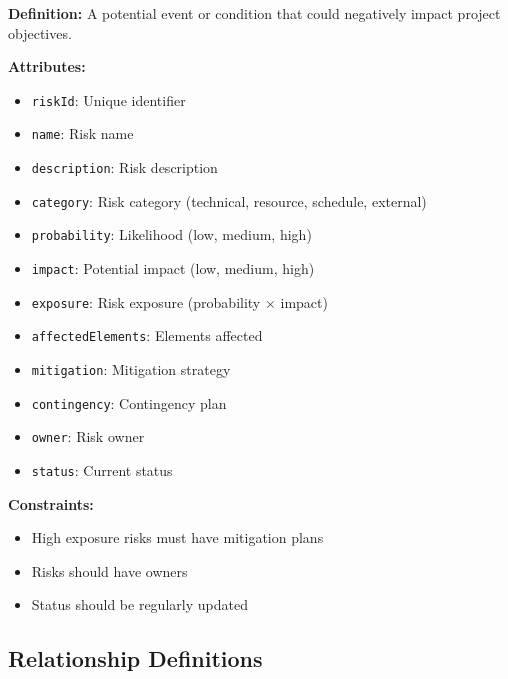 \documentclass[11pt,letterpaper]{article}
\begin{document}
\begin{definitionbox}
\textbf{Definition:} A potential event or condition that could negatively impact project objectives.

\textbf{Attributes:}
\begin{itemize}[nosep]
    \item \texttt{riskId}: Unique identifier
    \item \texttt{name}: Risk name
    \item \texttt{description}: Risk description
    \item \texttt{category}: Risk category (technical, resource, schedule, external)
    \item \texttt{probability}: Likelihood (low, medium, high)
    \item \texttt{impact}: Potential impact (low, medium, high)
    \item \texttt{exposure}: Risk exposure (probability $\times$ impact)
    \item \texttt{affectedElements}: Elements affected
    \item \texttt{mitigation}: Mitigation strategy
    \item \texttt{contingency}: Contingency plan
    \item \texttt{owner}: Risk owner
    \item \texttt{status}: Current status
\end{itemize}

\textbf{Constraints:}
\begin{itemize}[nosep]
    \item High exposure risks must have mitigation plans
    \item Risks should have owners
    \item Status should be regularly updated
\end{itemize}
\end{definitionbox}

\subsection{Relationship Definitions}
\end{document}
